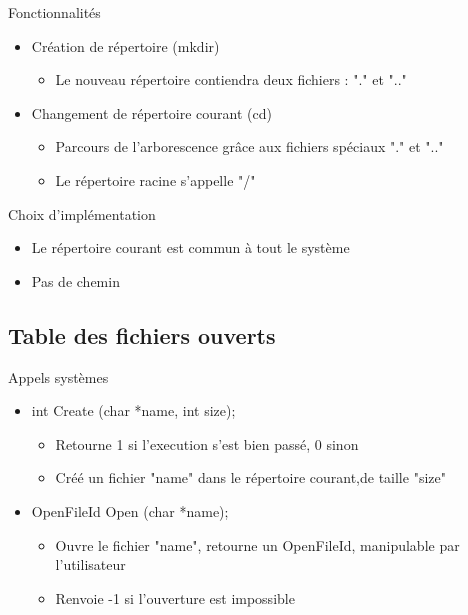 \documentclass{beamer}
\begin{document}
\begin{frame}
  \begin{block}{Fonctionnalités}
  	\begin{itemize}[<+->]
  		\item Création de répertoire (mkdir)
  		\begin{itemize}
  			\item<1-> Le nouveau répertoire contiendra deux fichiers : "." et ".."
  		\end{itemize}
  		\item<2-> Changement de répertoire courant (cd)
  		\begin{itemize}
  			\item<3-> Parcours de l'arborescence grâce aux fichiers spéciaux "." et ".."
  			\item<4-> Le répertoire racine s'appelle "/"
  		\end{itemize}
  	\end{itemize}
  \end{block}
  \begin{block}{Choix d'implémentation}
  	  \begin{itemize}
  	  	  \item<5-> Le répertoire courant est commun à tout le système
  	  	  \item<6-> Pas de chemin
  	  \end{itemize}
  \end{block}
\end{frame}

\subsection{Table des fichiers ouverts}
\begin{frame}
	\begin{block}{Appels systèmes}
		\begin{itemize}
			\item<1-> int Create (char *name, int size);
			\begin{itemize}
				\item<1->Retourne 1 si l'execution s'est bien passé, 0 sinon
				\item<1->Créé un fichier "name" dans le répertoire courant,de taille "size"
			\end{itemize}
			\item<2-> OpenFileId Open (char *name);
			\begin{itemize}
				\item<1->Ouvre le fichier "name", retourne un OpenFileId, manipulable par l'utilisateur
				\item<1->Renvoie -1 si l'ouverture est impossible
			\end{itemize}			
		\end{itemize}
	\end{block}
\end{frame}
\end{document}
